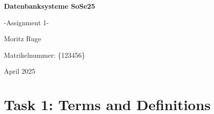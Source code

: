 \documentclass{article}
\begin{document}
\begin{titlepage}
    \centering
    \vspace*{3cm}
    {\Huge\bfseries Datenbanksysteme SoSe25 \par}
    \vspace{0.5cm}
    {\Huge -Assignment 1- \par}
    \vspace{1cm}
    {\Large Moritz Ruge \par}
    \vspace{1cm}
    {\large Matrikelnummer: \{123456\} \par}
    \vfill
    {\large April 2025}
\end{titlepage}



\section*{Task 1: Terms and Definitions}
\end{document}
